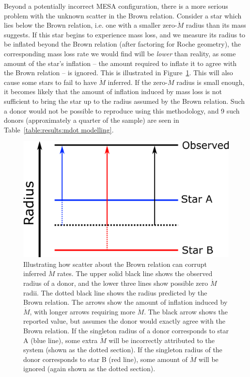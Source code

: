 Beyond a potentially incorrect MESA configuration, there is a more serious problem with the unknown scatter in the Brown relation.
Consider a star which lies below the Brown relation, i.e. one with a smaller zero-$\dot M$ radius than its mass suggests. If this star begins to experience mass loss, and we measure its radius to be inflated beyond the Brown relation (after factoring for Roche geometry), the corresponding mass loss rate we would find will be \textit{lower} than reality, as some amount of the star's inflation -- the amount required to inflate it to agree with the Brown relation -- is ignored.
This is illustrated in Figure~\ref{fig:massloss and AML:brown scatter causes bias}.
This will also cause some stars to fail to have $\dot M$ inferred. If the zero-$\dot M$ radius is small enough, it becomes likely that the amount of inflation induced by mass loss is not sufficient to bring the star up to the radius assumed by the Brown relation. Such a donor would not be possible to reproduce using this methodology, and 9 such donors (approximately a quarter of the sample) are seen in Table~\ref{table:results:mdot modelling}.
\begin{figure}
    \centering
    \includegraphics[width=.7\textwidth]{figures/results/brown_scatter_causes_bias.png}
    \caption{Illustrating how scatter about the Brown relation can corrupt inferred $\dot M$ rates. The upper solid black line shows the observed radius of a donor, and the lower three lines show possible zero $\dot M$ radii. The dotted black line shows the radius predicted by the Brown relation. The arrows show the amount of inflation induced by $\dot M$, with longer arrows requiring more $\dot M$. The black arrow shows the reported value, but assumes the donor would exactly agree with the Brown relation. If the singleton radius of a donor corresponds to star A (blue line), some extra $\dot M$ will be incorrectly attributed to the system (shown as the dotted section). If the singleton radius of the donor corresponds to star B (red line), some amount of $\dot M$ will be ignored (again shown as the dotted section).}
    \label{fig:massloss and AML:brown scatter causes bias}
\end{figure}

